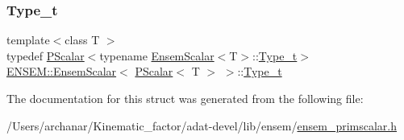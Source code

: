 \subsubsection{\texorpdfstring{Type\_t}{Type\_t}\hspace{0.1cm}{\footnotesize\ttfamily [3/3]}}
{\footnotesize\ttfamily template$<$class T $>$ \\
typedef \mbox{\hyperlink{classENSEM_1_1PScalar}{P\+Scalar}}$<$typename \mbox{\hyperlink{structENSEM_1_1EnsemScalar}{Ensem\+Scalar}}$<$T$>$\+::\mbox{\hyperlink{structENSEM_1_1EnsemScalar_3_01PScalar_3_01T_01_4_01_4_a6f38dbaec74e64f56351f84b5d2c8c0c}{Type\+\_\+t}}$>$ \mbox{\hyperlink{structENSEM_1_1EnsemScalar}{E\+N\+S\+E\+M\+::\+Ensem\+Scalar}}$<$ \mbox{\hyperlink{classENSEM_1_1PScalar}{P\+Scalar}}$<$ T $>$ $>$\+::\mbox{\hyperlink{structENSEM_1_1EnsemScalar_3_01PScalar_3_01T_01_4_01_4_a6f38dbaec74e64f56351f84b5d2c8c0c}{Type\+\_\+t}}}



The documentation for this struct was generated from the following file\+:\begin{DoxyCompactItemize}
\item 
/\+Users/archanar/\+Kinematic\+\_\+factor/adat-\/devel/lib/ensem/\mbox{\hyperlink{adat-devel_2lib_2ensem_2ensem__primscalar_8h}{ensem\+\_\+primscalar.\+h}}\end{DoxyCompactItemize}
